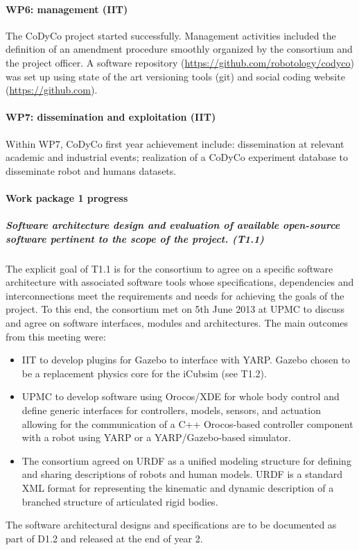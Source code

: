 \documentclass[12pt,a4paper,twoside]{article}
\begin{document}
\paragraph*{WP6: management (IIT)}

The CoDyCo project started successfully. Management activities included the definition of an amendment procedure smoothly organized by the consortium and the project officer. A software repository (\url{https://github.com/robotology/codyco}) was set up using state of the art versioning tools (git) and social coding website (\url{https://github.com}). 

\paragraph*{WP7: dissemination and exploitation (IIT)}

Within WP7, CoDyCo first year achievement include: dissemination at relevant academic and industrial events; realization of a CoDyCo experiment database to disseminate robot and humans datasets. 

\paragraph{Work package 1 progress}

\subparagraph{Software architecture design and evaluation of available open-source software pertinent to the scope of the project. (T1.1)}

The explicit goal of T1.1 is for the consortium to agree on a specific software architecture with associated software tools whose specifications, dependencies and interconnections meet the requirements and needs for achieving the goals of the project.  To this end, the consortium met on 5th June 2013 at UPMC to discuss and agree on software interfaces, modules and architectures. The main outcomes from this meeting were: 
\begin{itemize}
\item IIT to develop plugins for Gazebo to interface with YARP. Gazebo chosen to be a replacement physics core for the iCubsim (see T1.2). 
\item UPMC to develop software using Orocos/XDE for whole body control and define generic interfaces for controllers, models, sensors, and actuation allowing for the communication of a C++ Orocos-based controller component with a robot using YARP or a YARP/Gazebo-based simulator.
\item  The consortium agreed on URDF as a unified modeling structure for defining and sharing descriptions of robots and human models. URDF is a standard XML format for representing the kinematic and dynamic description of a branched structure of articulated rigid bodies. 
\end{itemize}
The software architectural designs and specifications are to be documented as part of D1.2 and released at the end of year 2. 
\end{document}
